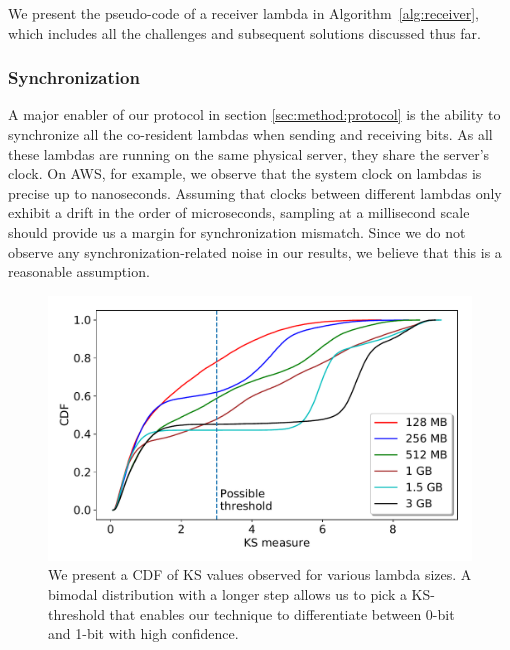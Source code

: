 We present the pseudo-code of a receiver lambda in Algorithm~\ref{alg:receiver},
which includes all the challenges and subsequent solutions discussed thus
far.

\subsubsection{Synchronization} 
A major enabler of our protocol in section \ref{sec:method:protocol} is the ability 
to synchronize all the co-resident lambdas when sending and receiving 
bits. As all these lambdas are running on the same physical
server, they share the server's clock. On AWS, for example, we observe that the
system clock on lambdas is precise up to nanoseconds. 
Assuming that clocks between different lambdas only exhibit a drift in the order
of microseconds, sampling at a millisecond scale should provide us a margin for
synchronization mismatch. Since we do not observe any synchronization-related
noise in our results, we believe that this is a reasonable assumption.


\begin{figure}[!t]
  \includegraphics[width=.99\linewidth]{fig/ksvalues.pdf}
  \caption{We present a CDF of KS values observed for various lambda sizes. A bimodal distribution 
  with a longer step allows us to pick a KS-threshold that enables our technique to differentiate 
  between 0-bit and 1-bit with high confidence. 
\label{fig:ks_values}}
\end{figure}


